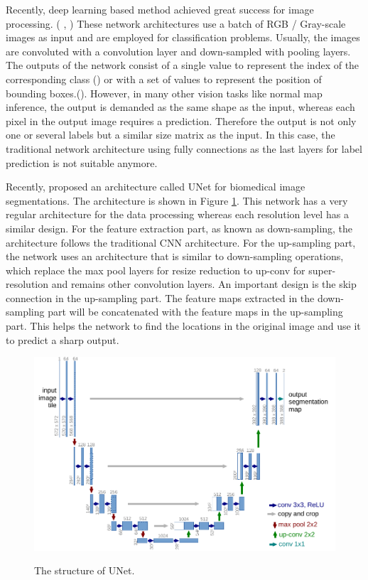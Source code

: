 Recently, deep learning based method achieved great success for image processing. ( \cite{yolov3}, \cite{efficientDet}) These network architectures use a batch of RGB / Gray-scale images as input and are employed for classification problems. Usually, the images are convoluted with a convolution layer and down-sampled with pooling layers. The outputs of the network consist of a single value to represent the index of the corresponding class (\cite{efficientDet}) or with a set of values to represent the position of bounding boxes.(\cite{yolov3}). However, in many other vision tasks like normal map inference, the output is demanded as the same shape as the input, whereas each pixel in the output image requires a prediction. Therefore the output is not only one or several labels but a similar size matrix as the input. In this case, the traditional network architecture using fully connections as the last layers for label prediction is not suitable anymore.

Recently,\cite{unet} proposed an architecture called UNet for biomedical image segmentations. The architecture is shown in Figure \ref{fig:u-net}. This network has a very regular architecture for the data processing whereas each resolution level has a similar design. For the feature extraction part, as known as down-sampling, the architecture follows the traditional CNN architecture. For the up-sampling part, the network uses an architecture that is similar to down-sampling operations, which replace the max pool layers for resize reduction to up-conv for super-resolution and remains other convolution layers. An important design is the skip connection in the up-sampling part. The feature maps extracted in the down-sampling part will be concatenated with the feature maps in the up-sampling part. This helps the network to find the locations in the original image and use it to predict a sharp output.

\begin{figure}[th]
	\centering
	\includegraphics[width=.8\textwidth]{./Figures/u-net-illustration-correct-scale2.pdf}
	\decoRule
	\label{fig:u-net}
	\caption{The structure of UNet. \cite{unet}}
\end{figure}

